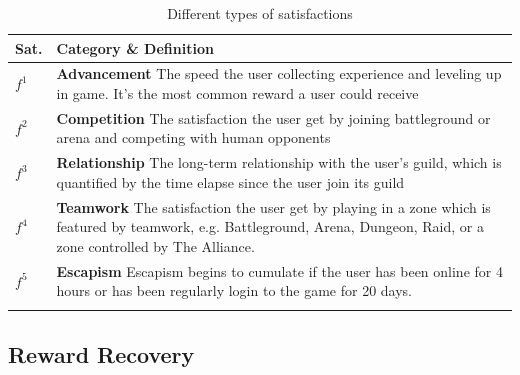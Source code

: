 \documentclass{sigchi}
\begin{document}
\begin{table}
\caption{Different types of satisfactions}
\begin{tabularx}{\textwidth}{lX}
    Sat. & \textbf{Category} \& Definition \\
    \midrule
    $f^1$ & \textbf{Advancement} The speed the user collecting experience and leveling up in game. It's the most common reward a user could receive \\
    $f^2$ & \textbf{Competition} The satisfaction the user get by joining battleground or arena and competing with human opponents \\
    $f^3$ & \textbf{Relationship} The long-term relationship with the user's guild, which is quantified by the time elapse since the user join its guild \\
    $f^4$ & \textbf{Teamwork} The satisfaction the user get by playing in a zone which is featured by teamwork, e.g. Battleground, Arena, Dungeon, Raid, or a zone controlled by The Alliance. \\
    $f^5$ & \textbf{Escapism} Escapism begins to cumulate if the user has been online for 4 hours or has been regularly login to the game for 20 days. \\
    \label{tbl:satisfactions}
\end{tabularx}
\end{table}



\subsection{Reward Recovery}
\end{document}

